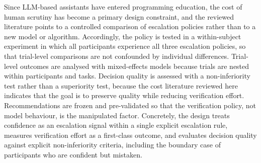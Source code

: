 \documentclass[oneside,final,14pt,a4paper]{extreport}
\begin{document}
Since LLM-based assistants have entered programming education, the cost of
human scrutiny has become a primary design constraint, and the reviewed
literature points to a controlled comparison of escalation policies rather
than to a new model or algorithm. Accordingly, the policy is tested in a
within-subject experiment in which all participants experience all three
escalation policies, so that trial-level comparisons are not confounded by
individual differences. Trial-level outcomes are analysed with mixed-effects
models because trials are nested within participants and tasks. Decision
quality is assessed with a non-inferiority test rather than a superiority
test, because the cost literature reviewed here indicates that the goal is to
preserve quality while reducing verification effort. Recommendations are
frozen and pre-validated so that the verification policy, not model behaviour,
is the manipulated factor. Concretely, the design treats confidence as an
escalation signal within a single explicit escalation rule, measures
verification effort as a first-class outcome, and evaluates decision quality
against explicit non-inferiority criteria, including the boundary case of
participants who are confident but mistaken.


\printbibliography[heading=bibintoc,title={References}]
\end{document}
